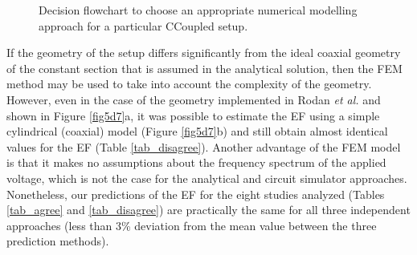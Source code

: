 \begin{figure}
\caption{Decision flowchart to choose an appropriate numerical modelling approach for a particular CCoupled setup.}
\label{fig5d10}
\end{figure}

If the geometry of the setup differs significantly from the ideal coaxial geometry of the constant section that is assumed in the analytical solution, then the \acs{FEM} method may be used to take into account the complexity of the geometry. However, even in the case of the geometry implemented in Rodan \textit{et al.} \cite{Rodan1978-yu} and shown in Figure \ref{fig5d7}a, it was possible to estimate the \acs{EF} using a simple cylindrical (coaxial) model (Figure \ref{fig5d7}b) and still obtain almost identical values for the \acs{EF} (Table \ref{tab_disagree}). Another advantage of the \acs{FEM} model is that it makes no assumptions about the frequency spectrum of the applied voltage, which is not the case for the analytical and circuit simulator approaches. Nonetheless, our predictions of the \acs{EF} for the eight studies analyzed (Tables \ref{tab_agree} and \ref{tab_disagree}) are practically the same for all three independent approaches (less than 3\% deviation from the mean value between the three prediction methods). 

